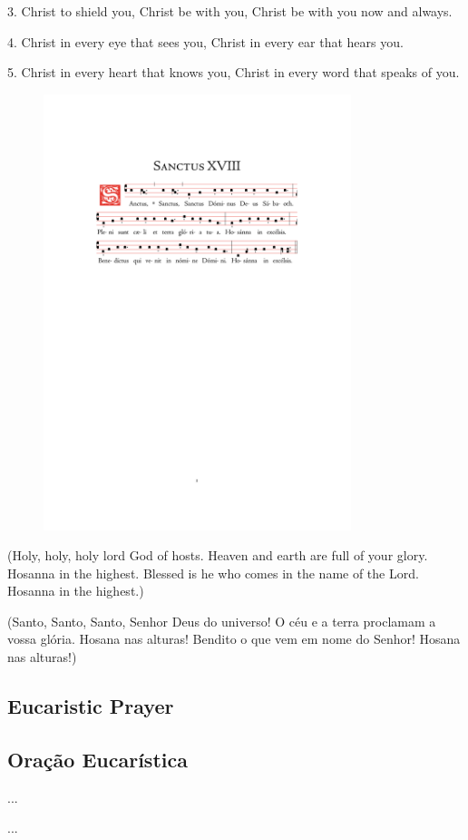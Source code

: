 \documentclass[10pt,a5]{article}
\newcommand \subsect[2] {\subsection*{#1} \switchcolumn \subsection*{#2} \switchcolumn*}
\begin{document}
3. Christ to shield you, Christ be with you,
Christ be with you now and always.

4. Christ in every eye that sees you,
Christ in every ear that hears you.

5. Christ in every heart that knows you,
Christ in every word that speaks of you.

\begin{figure}[h!]
	\centering
	\includegraphics[trim = 35mm 175mm 35.5mm 45mm, clip, width = 0.8\textwidth]{scores/Sanctus-XVIII.pdf}
\end{figure}

\begin{paracol}{2}

(Holy, holy, holy lord God of hosts.
Heaven and earth are full of your glory.
Hosanna in the highest.
Blessed is he who comes in the name of the Lord.
Hosanna in the highest.)

\switchcolumn
(Santo, Santo, Santo, Senhor Deus do universo! O céu e a terra proclamam a vossa glória. 
Hosana nas alturas! Bendito o que vem em nome do Senhor! Hosana nas alturas!)

\switchcolumn*

\subsect{Eucaristic Prayer}{Ora\c{c}\~ao Eucar\'istica}

...


\switchcolumn

...


\end{paracol}
\end{document}
